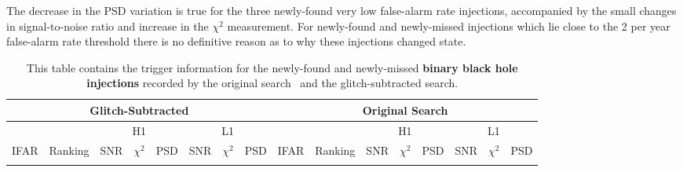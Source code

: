 The decrease in the PSD variation is true for the three newly-found very low false-alarm rate injections, accompanied by the small changes in signal-to-noise ratio and increase in the $\chi^{2}$ measurement. For newly-found and newly-missed injections which lie close to the 2 per year false-alarm rate threshold there is no definitive reason as to why these injections changed state.

\newpage
{} %
\begin{landscape}
\begin{table}[tb]
\centering
\caption{\label{4:tab:apdx_changed_snr_bbh}This table contains the trigger information for the newly-found and newly-missed \textbf{binary black hole injections} recorded by the original search~\cite{gwtc3:2023} and the glitch-subtracted search.} 
\begin{tabular}{|c|c|c|c|c|c|c|c||c|c|c|c|c|c|c|c|}
\hline
\multicolumn{8}{|c||}{Glitch-Subtracted} & \multicolumn{8}{c|}{Original Search} \\
\hline
\multicolumn{2}{|c|}{} & \multicolumn{3}{c|}{H1} & \multicolumn{3}{c||}{L1} & \multicolumn{2}{c|}{} & \multicolumn{3}{c|}{H1} & \multicolumn{3}{c|}{L1}\\
\hline
IFAR & Ranking & SNR & $\chi^{2}$ & PSD & SNR & $\chi^{2}$ & PSD & IFAR & Ranking & SNR & $\chi^{2}$ & PSD & SNR & $\chi^{2}$ & PSD \\ &


\end{tabular}
\end{table}
\end{landscape}
